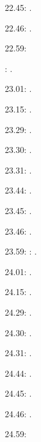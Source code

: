 \label{key}\documentclass[italian]{article}
\begin{document}
22.45:     .

22.46:     .

22.59:     

:    .

23.01:     . 

23.15:     . 

23.29:     . 

23.30:     .

23.31:     .

23.44:     .

23.45:     .

23.46:     .

23.59:     
:    .

24.01:     . 

24.15:     . 

24.29:     . 

24.30:     .

24.31:     .

24.44:     .

24.45:     .

24.46:     .

24.59:     
\end{document}
